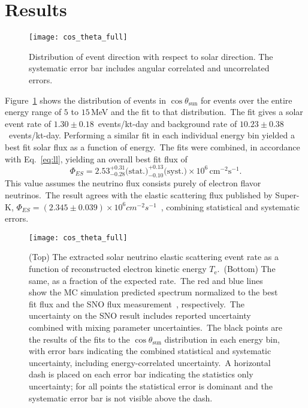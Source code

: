 \section{Results}
\begin{figure}
  \centering
  \texttt{[image: cos\_theta\_full]}
  \caption[5.0 to 15.0 MeV $\cos\theta_{sun}$ Distribution] {Distribution of event direction
                                              with respect to solar direction.
                                              The systematic error bar includes
                                              angular correlated and
                                              uncorrelated errors.}

  \label{fig:costheta}
\end{figure}
Figure~\ref{fig:costheta} shows the distribution of events in $\cos\theta_\text{{sun}}$
for events over the entire energy range of $5$ to $15$\,MeV and the fit to that distribution.\
The fit gives a solar event rate of $1.30\pm0.18$~events/kt-day
 and background rate of  $10.23\pm0.38$~events/kt-day.
Performing a similar fit in each individual energy bin yielded a best fit solar flux
as a function of energy.\
The fits were combined, in accordance with Eq.~\ref{eq:ll}, yielding an overall best fit flux of
\begin{equation*}
    \Phi_{ES}= 2.53^{+0.31}_{-0.28}\text{(stat.)}^{+0.13}_{-0.10}\text{(syst.)}\times10^6\,\text{cm}^{-2}\text{s}^{-1}\text{.}
\end{equation*}
This value assumes the neutrino flux consists purely of electron flavor neutrinos.\
The result agrees with the elastic scattering flux published by Super-K,
$\Phi_{ES}=\left(2.345\pm0.039\right)\times10^{6}cm^{-2}s^{-1}$~\cite{superk4},
combining statistical and systematic errors.\

\begin{figure}
  \centering
  \texttt{[image: cos\_theta\_full]}
  \caption[Solar Spectrum Data to MC Comparison]{
    (Top) The extracted solar neutrino elastic scattering event rate as a
    function of reconstructed electron kinetic energy $T_{\mathrm{e}}$.\
    (Bottom) The same, as a fraction of the expected rate.\
    The red and blue lines show the MC simulation predicted spectrum normalized
    to the best fit flux and the SNO flux measurement~\cite{sno_combined}, respectively.\
    The uncertainty on the SNO result includes reported uncertainty combined with
    mixing parameter uncertainties.\
    The black points are the results of the fits to the $\cos\theta_\text{{sun}}$
    distribution in each energy bin,
    with error bars indicating the combined statistical and systematic
    uncertainty, including energy-correlated uncertainty.\
    A horizontal dash is placed on each error bar indicating the statistics
    only uncertainty; for all points the statistical error is dominant and the systematic
    error bar is not visible above the dash.}
  \label{fig:spectrum}
\end{figure}

